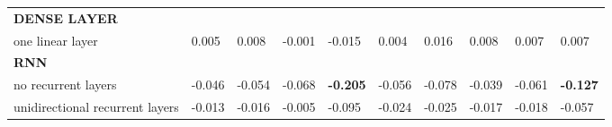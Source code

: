 \begin{tabular}{llllllllll}
\textbf{DENSE LAYER}            &                &                &                 &                 &                 &                 &                 &                 &                 \\
one linear layer                & 0.005          & 0.008          & -0.001          & -0.015          & 0.004           & 0.016           & 0.008           & 0.007           & 0.007           \\
\textbf{RNN}                    &                &                &                 & \textbf{}       &                 &                 &                 &                 & \textbf{}       \\
no recurrent layers             & -0.046         & -0.054         & -0.068          & \textbf{-0.205} & -0.056          & -0.078          & -0.039          & -0.061          & \textbf{-0.127} \\
unidirectional recurrent layers & -0.013         & -0.016         & -0.005          & -0.095          & -0.024          & -0.025          & -0.017          & -0.018          & -0.057         
\end{tabular}
